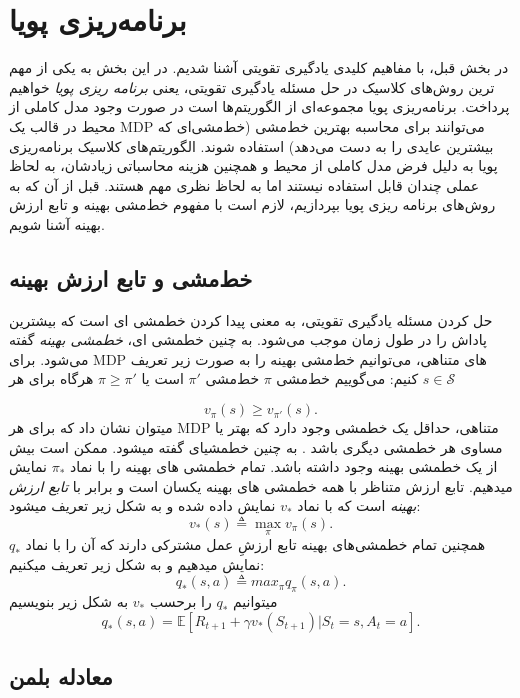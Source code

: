 \section{برنامه‌ریزی پویا}
در بخش قبل، با مفاهیم کلیدی یادگیری تقویتی آشنا شدیم. در این بخش به یکی از مهم ترین روش‌های کلاسیک در حل مسئله یادگیری تقویتی، یعنی 
\textit{برنامه ریزی پویا}
خواهیم پرداخت. برنامه‌ریزی پویا
 مجموعه‌ای از الگوریتم‌ها است در صورت وجود مدل کاملی از محیط در قالب یک 
MDP
 می‌توانند برای محاسبه بهترین خط‌مشی (خط‌مشی‌ای که بیشترین عایدی را به دست می‌دهد) استفاده شوند.
الگوریتم‌های کلاسیک برنامه‌ریزی پویا به دلیل فرض
مدل کاملی از محیط و همچنین هزینه محاسباتی زیادشان، به لحاظ عملی چندان قابل استفاده نیستند اما به لحاظ نظری مهم هستند. قبل از آن که به روش‌های برنامه ریزی پویا بپردازیم، لازم است با مفهوم خط‌مشی بهینه و تابع ارزش بهینه آشنا شویم.
\subsection{خط‌مشی و تابع ارزش بهینه}
حل کردن مسئله یادگیری تقویتی، به معنی پیدا کردن خط\nf مشی ای است که بیشترین پاداش را در طول زمان موجب می‌شود.	به چنین خط\nf مشی ای، 
\textit{خط\nf مشی بهینه} 
گفته می‌شود. برای
 MDP‌ 
 های متناهی، می‌توانیم خط‌مشی بهینه را به صورت زیر تعریف کنیم:
می‌گوییم خط‌مشی $\pi$  خط‌مشی 
$\pi'$
است یا
$\pi \ge \pi'$
هرگاه برای هر 
$s \in \mathcal{S}$

$$v_\pi(s) \ge v_{\pi'}(s).$$
 می\nf توان نشان داد که برای هر MDP متناهی، حداقل یک خط\nf مشی وجود دارد که بهتر یا مساوی هر خط\nf مشی دیگری باشد
\cite{suttonbook}.
 به چنین خط\nf مشی\nf ای  گفته می\nf  شود. ممکن است بیش از یک خط\nf مشی بهینه وجود داشته باشد. تمام خط\nf مشی\nf‌ های بهینه را با نماد $\pi_*$  نمایش می\nf دهیم. تابع ارزش متناظر با همه خط\nf مشی\nf‌ های بهینه یکسان است و برابر با 
\textit{تابع ارزش بهینه}
 است که با نماد $v_*$ نمایش داده شده و به شکل زیر تعریف می\nf شود:
$$v_*(s) \triangleq \max_{\pi} v_\pi(s).$$
همچنین تمام خط\nf مشی\nf ‌های بهینه تابع ارزشِ عمل مشترکی دارند که آن را با نماد $q_*$ نمایش می\nf دهیم و به شکل زیر تعریف می\nf کنیم:
$$q_*(s,a) \triangleq max_{\pi} q_\pi(s,a).$$
می\nf توانیم $q_*$ را برحسب $v_*$ به شکل زیر بنویسیم
\begin{equation}
q_* (s,a) = \mathbb{E}[R_{t+1} + \gamma v_*(S_{t+1})| S_t=s, A_t=a].
\end{equation}

\subsection{معادله بلمن}

